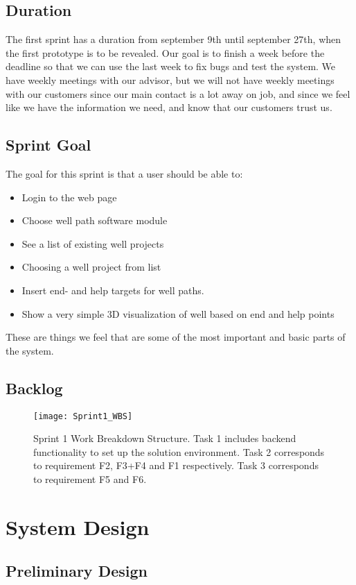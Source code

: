 \documentclass{report}
\begin{document}
\subsection{Duration} \label{subsec:duration1}
The first sprint has a duration from september 9th until september 27th, when the first prototype is to be revealed. Our goal is to finish a week before the deadline so that we can use the last week to fix bugs and test the system. We have weekly meetings with our advisor, but we will not have weekly meetings with our customers since our main contact is a lot away on job, and since we feel like we have the information we need, and know that our customers trust us.

\subsection{Sprint Goal} \label{subsec:sprint_goal1}
The goal for this sprint is that a user should be able to:
\begin{itemize}
\item Login to the web page 
\item Choose well path software module 
\item See a list of existing well projects
\item Choosing a well project from list
\item Insert end- and help targets for well paths.
\item Show a very simple 3D visualization of well based on end and help points
\end{itemize}
These are things we feel that are some of the most important and basic parts of the system.
\subsection{Backlog} \label{subsec:backlog1} %
\begin{figure}
    \centering
    \texttt{[image: Sprint1\_WBS]}
    \caption{Sprint 1 Work Breakdown Structure. Task 1 includes backend functionality to set up the solution environment. Task 2 corresponds to requirement F2, F3+F4 and F1 respectively. Task 3 corresponds to requirement F5 and F6.  \label{fig:sprint1_WBS}}
\end{figure}
\section{System Design} \label{sec:system:_design1}
\subsection{Preliminary Design} \label{subsec:prelim_design1}
\end{document}
